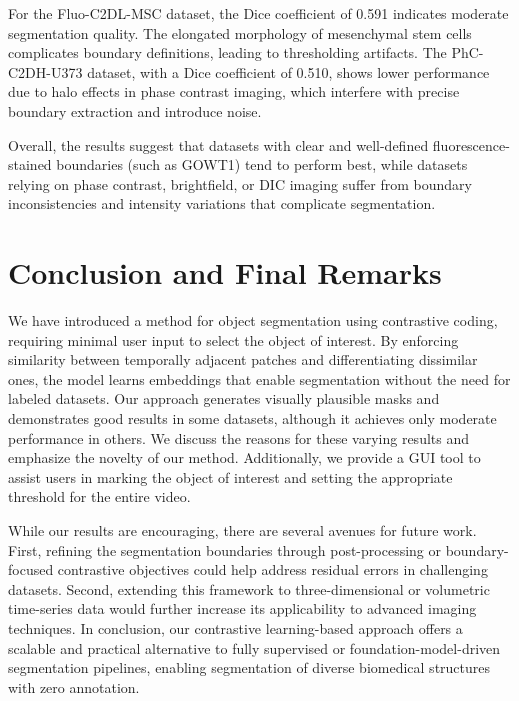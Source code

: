 \documentclass[./dissertation.tex]{subfiles}
\begin{document}
For the Fluo-C2DL-MSC dataset, the Dice coefficient of 0.591 indicates moderate segmentation quality. The elongated morphology of mesenchymal stem cells complicates boundary definitions, leading to thresholding artifacts. The PhC-C2DH-U373 dataset, with a Dice coefficient of 0.510, shows lower performance due to halo effects in phase contrast imaging, which interfere with precise boundary extraction and introduce noise.

Overall, the results suggest that datasets with clear and well-defined fluorescence-stained boundaries (such as GOWT1) tend to perform best, while datasets relying on phase contrast, brightfield, or DIC imaging suffer from boundary inconsistencies and intensity variations that complicate segmentation.


\label{Conclusion}
\section{Conclusion and Final Remarks}

We have introduced a method for object segmentation using contrastive coding, requiring minimal user input to select the object of interest. By enforcing similarity between temporally adjacent patches and differentiating dissimilar ones, the model learns embeddings that enable segmentation without the need for labeled datasets. Our approach generates visually plausible masks and demonstrates good results in some datasets, although it achieves only moderate performance in others. We discuss the reasons for these varying results and emphasize the novelty of our method. Additionally, we provide a GUI tool to assist users in marking the object of interest and setting the appropriate threshold for the entire video.

While our results are encouraging, there are several avenues for future work. First, refining the segmentation boundaries through post-processing or boundary-focused contrastive objectives could help address residual errors in challenging datasets. Second, extending this framework to three-dimensional or volumetric time-series data would further increase its applicability to advanced imaging techniques. In conclusion, our contrastive learning-based approach offers a scalable and practical alternative to fully supervised or foundation-model-driven segmentation pipelines, enabling segmentation of diverse biomedical structures with zero annotation.
\end{document}
